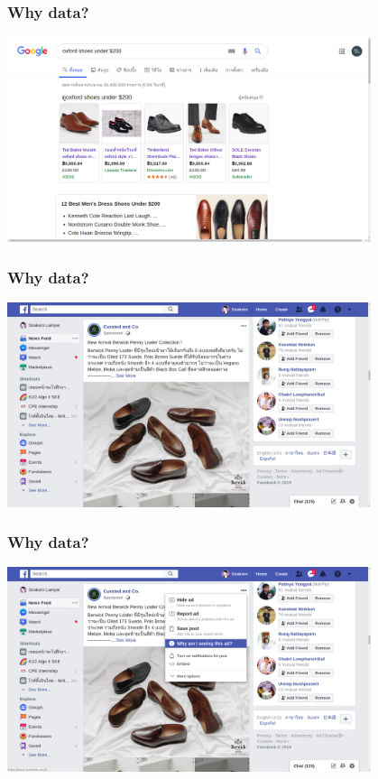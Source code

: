 \documentclass[aspectratio=169]{beamer}
\begin{document}
\begin{frame}
    \frametitle{Why data?}
    \centering
    \includegraphics[width=0.8\textwidth]{images/leather-shoes-google.png}
\end{frame}

\begin{frame}
    \frametitle{Why data?}
    \centering
    \includegraphics[width=0.8\textwidth]{images/facebook-ads.png}
\end{frame}

\begin{frame}
    \frametitle{Why data?}
    \centering
    \includegraphics[width=0.8\textwidth]{images/facebook-ads-why-am-i-seeing.png}
\end{frame}
\end{document}
